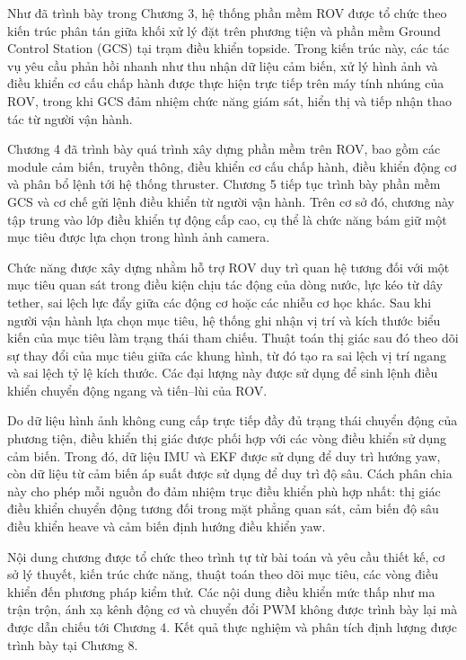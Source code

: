 \documentclass[../DoAn.tex]{subfiles}
\begin{document}
Như đã trình bày trong Chương 3, hệ thống phần mềm ROV được tổ chức theo kiến trúc phân tán giữa khối xử lý đặt trên phương tiện và phần mềm Ground Control Station (GCS) tại trạm điều khiển topside. Trong kiến trúc này, các tác vụ yêu cầu phản hồi nhanh như thu nhận dữ liệu cảm biến, xử lý hình ảnh và điều khiển cơ cấu chấp hành được thực hiện trực tiếp trên máy tính nhúng của ROV, trong khi GCS đảm nhiệm chức năng giám sát, hiển thị và tiếp nhận thao tác từ người vận hành.

Chương 4 đã trình bày quá trình xây dựng phần mềm trên ROV, bao gồm các module cảm biến, truyền thông, điều khiển cơ cấu chấp hành, điều khiển động cơ và phân bổ lệnh tới hệ thống thruster. Chương 5 tiếp tục trình bày phần mềm GCS và cơ chế gửi lệnh điều khiển từ người vận hành. Trên cơ sở đó, chương này tập trung vào lớp điều khiển tự động cấp cao, cụ thể là chức năng bám giữ một mục tiêu được lựa chọn trong hình ảnh camera.

Chức năng được xây dựng nhằm hỗ trợ ROV duy trì quan hệ tương đối với một mục tiêu quan sát trong điều kiện chịu tác động của dòng nước, lực kéo từ dây tether, sai lệch lực đẩy giữa các động cơ hoặc các nhiễu cơ học khác. Sau khi người vận hành lựa chọn mục tiêu, hệ thống ghi nhận vị trí và kích thước biểu kiến của mục tiêu làm trạng thái tham chiếu. Thuật toán thị giác sau đó theo dõi sự thay đổi của mục tiêu giữa các khung hình, từ đó tạo ra sai lệch vị trí ngang và sai lệch tỷ lệ kích thước. Các đại lượng này được sử dụng để sinh lệnh điều khiển chuyển động ngang và tiến--lùi của ROV.

Do dữ liệu hình ảnh không cung cấp trực tiếp đầy đủ trạng thái chuyển động của phương tiện, điều khiển thị giác được phối hợp với các vòng điều khiển sử dụng cảm biến. Trong đó, dữ liệu IMU và EKF được sử dụng để duy trì hướng yaw, còn dữ liệu từ cảm biến áp suất được sử dụng để duy trì độ sâu. Cách phân chia này cho phép mỗi nguồn đo đảm nhiệm trục điều khiển phù hợp nhất: thị giác điều khiển chuyển động tương đối trong mặt phẳng quan sát, cảm biến độ sâu điều khiển heave và cảm biến định hướng điều khiển yaw.

Nội dung chương được tổ chức theo trình tự từ bài toán và yêu cầu thiết kế, cơ sở lý thuyết, kiến trúc chức năng, thuật toán theo dõi mục tiêu, các vòng điều khiển đến phương pháp kiểm thử. Các nội dung điều khiển mức thấp như ma trận trộn, ánh xạ kênh động cơ và chuyển đổi PWM không được trình bày lại mà được dẫn chiếu tới Chương 4. Kết quả thực nghiệm và phân tích định lượng được trình bày tại Chương 8.
\end{document}
